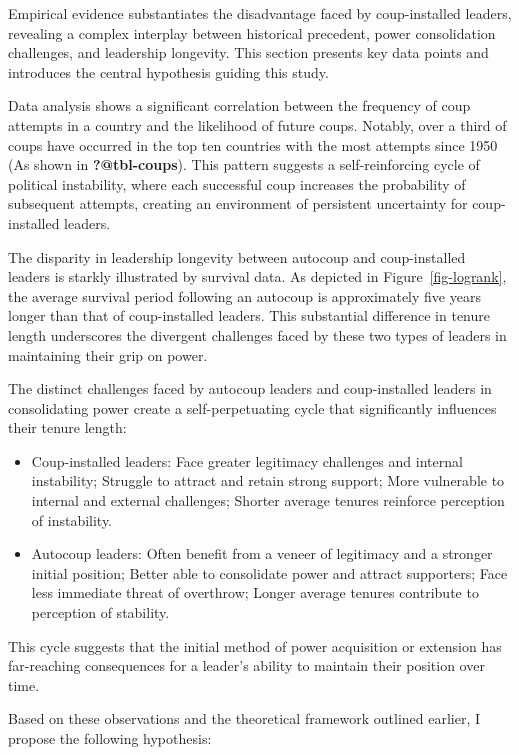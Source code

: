 \documentclass[
  12pt,
]{report}
\begin{document}
Empirical evidence substantiates the disadvantage faced by
coup-installed leaders, revealing a complex interplay between historical
precedent, power consolidation challenges, and leadership longevity.
This section presents key data points and introduces the central
hypothesis guiding this study.

Data analysis shows a significant correlation between the frequency of
coup attempts in a country and the likelihood of future coups. Notably,
over a third of coups have occurred in the top ten countries with the
most attempts since 1950 (As shown in \textbf{?@tbl-coups}). This
pattern suggests a self-reinforcing cycle of political instability,
where each successful coup increases the probability of subsequent
attempts, creating an environment of persistent uncertainty for
coup-installed leaders.

The disparity in leadership longevity between autocoup and
coup-installed leaders is starkly illustrated by survival data. As
depicted in Figure~\ref{fig-logrank}, the average survival period
following an autocoup is approximately five years longer than that of
coup-installed leaders. This substantial difference in tenure length
underscores the divergent challenges faced by these two types of leaders
in maintaining their grip on power.

The distinct challenges faced by autocoup leaders and coup-installed
leaders in consolidating power create a self-perpetuating cycle that
significantly influences their tenure length:

\begin{itemize}
\item
  Coup-installed leaders: Face greater legitimacy challenges and
  internal instability; Struggle to attract and retain strong support;
  More vulnerable to internal and external challenges; Shorter average
  tenures reinforce perception of instability.
\item
  Autocoup leaders: Often benefit from a veneer of legitimacy and a
  stronger initial position; Better able to consolidate power and
  attract supporters; Face less immediate threat of overthrow; Longer
  average tenures contribute to perception of stability.
\end{itemize}

This cycle suggests that the initial method of power acquisition or
extension has far-reaching consequences for a leader's ability to
maintain their position over time.

Based on these observations and the theoretical framework outlined
earlier, I propose the following hypothesis:
\end{document}
